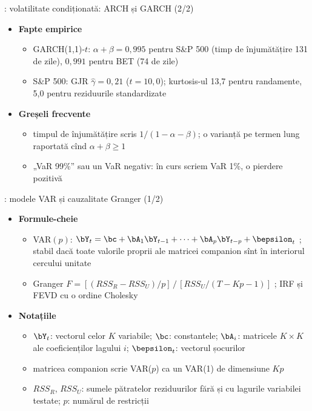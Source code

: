 \begin{frame}{: volatilitate condiționată: ARCH și GARCH (2/2)}
\itemsize{\footnotesize}
\begin{itemize}
    \item \textbf{Fapte empirice}
    \begin{itemize}
        \item GARCH(1,1)-$t$: $\alpha + \beta = 0{,}995$ pentru S\&P 500 (timp de înjumătățire 131 de zile), $0{,}991$ pentru BET (74 de zile)
        \item S\&P 500: GJR $\hat\gamma = 0{,}21$ ($t = 10{,}0$); kurtosis-ul 13{,}7 pentru randamente, 5{,}0 pentru reziduurile standardizate
    \end{itemize}
    \item \textbf{Greșeli frecvente}
    \begin{itemize}
        \item timpul de înjumătățire scris $1/(1 - \alpha - \beta)$; o varianță pe termen lung raportată cînd $\alpha + \beta \ge 1$
        \item „VaR 99\%” sau un VaR negativ: în curs scriem VaR 1\%, o pierdere pozitivă
    \end{itemize}
\end{itemize}
\end{frame}

\begin{frame}{: modele VAR și cauzalitate Granger (1/2)}
\itemsize{\footnotesize}
\begin{itemize}
    \item \textbf{Formule-cheie}
    \begin{itemize}
        \item VAR$(p)$: $\bY_t = \bc + \bA_1\bY_{t-1} + \dots + \bA_p\bY_{t-p} + \bepsilon_t$ ; stabil dacă toate valorile proprii ale matricei companion sînt în interiorul cercului unitate
        \item Granger $F = [(RSS_R - RSS_U)/p]\,/\,[RSS_U/(T - Kp - 1)]$ ; IRF și FEVD cu o ordine Cholesky
    \end{itemize}
    \item \textbf{Notațiile}
    \begin{itemize}
        \item $\bY_t$: vectorul celor $K$ variabile; $\bc$: constantele; $\bA_i$: matricele $K \times K$ ale coeficienților lagului $i$; $\bepsilon_t$: vectorul șocurilor
        \item matricea companion scrie VAR($p$) ca un VAR(1) de dimensiune $Kp$
        \item $RSS_R$, $RSS_U$: sumele pătratelor reziduurilor fără și cu lagurile variabilei testate; $p$: numărul de restricții
    \end{itemize}
\end{itemize}
\end{frame}

